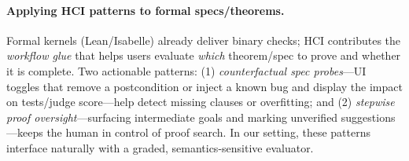 \documentclass{article}
\begin{document}
\paragraph{Applying HCI patterns to formal specs/theorems.}
Formal kernels (Lean/Isabelle) already deliver binary checks; HCI contributes the \emph{workflow glue} that helps users evaluate \emph{which} theorem/spec to prove and whether it is complete. Two actionable patterns: (1) \emph{counterfactual spec probes}---UI toggles that remove a postcondition or inject a known bug and display the impact on tests/judge score---help detect missing clauses or overfitting; and (2) \emph{stepwise proof oversight}---surfacing intermediate goals and marking unverified suggestions---keeps the human in control of proof search. In our setting, these patterns interface naturally with a graded, semantics-sensitive evaluator.%


\end{document}
